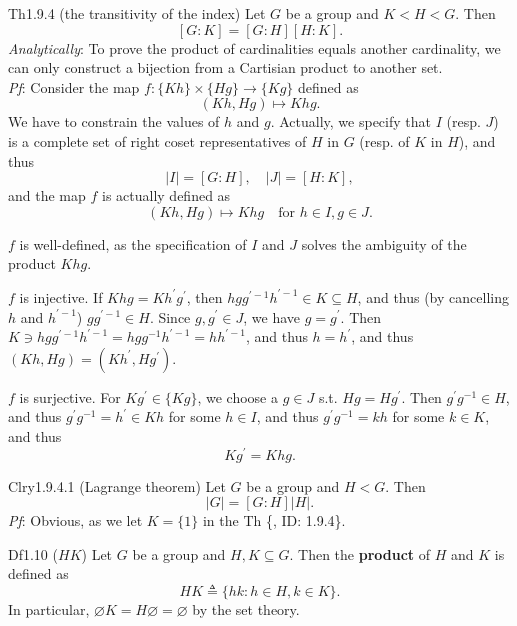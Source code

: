 \documentclass{article}
\begin{document}
\begin{Th}{Th1.9.4 (the transitivity of the index)}
    Let $G$ be a group and $K<H<G$. Then
    $$ [G:K] = [G:H][H:K]. $$
    \tcblower
    \textcolor{P}{\textit{Analytically}: To prove the product of cardinalities equals another cardinality, we can only construct a bijection from a Cartisian product to another set.} \\
    \textit{Pf}: Consider the map $f: \{Kh\}\times\{Hg\}\to \{Kg\}$ defined as
    $$ (Kh, Hg)\mapsto Khg. $$
    We have to constrain the values of $h$ and $g$. Actually, we specify that $I$ (resp. $J$) is a complete set of right coset representatives of $H$ in $G$ (resp. of $K$ in $H$), and thus
    $$ |I| = [G:H], \quad |J| = [H:K], $$
    and the map $f$ is actually defined as 
    $$ (Kh, Hg)\mapsto Khg \quad \text{for } h\in I, g\in J. $$
    \begin{compactenum}
        \item $f$ is well-defined, as the specification of $I$ and $J$ solves the ambiguity of the product $Khg$.
        \item $f$ is injective. If $Khg = Kh^\prime g^\prime$, then $hgg^{\prime-1}h^{\prime-1}\in K\subseteq H$, and thus (by cancelling $h$ and $h^{\prime-1}$) $gg^{\prime-1}\in H$. Since $g, g^\prime\in J$, we have $g = g^\prime$. Then $K\ni hgg^{\prime-1}h^{\prime-1} = hgg^{-1}h^{\prime-1} = hh^{\prime-1}$, and thus $h = h^\prime$, and thus $(Kh, Hg) = (Kh^\prime, Hg^\prime)$.
        \item $f$ is surjective. For $Kg^\prime\in\{Kg\}$, we choose a $g\in J$ s.t. $Hg = Hg^\prime$. Then $g^\prime g^{-1}\in H$, and thus $g^\prime g^{-1} = h^\prime \in Kh$ for some $h\in I$, and thus $g^\prime g^{-1} = kh$ for some $k\in K$, and thus
        $$ Kg^\prime = Khg. $$
    \end{compactenum}
\end{Th}

\begin{Th}{Clry1.9.4.1 (Lagrange theorem)}
    Let $G$ be a group and $H<G$. Then
    $$ |G| = [G:H]|H|. $$
    \tcblower
    \textit{Pf}: Obvious, as we let $K = \{1\}$ in the Th \{, ID: 1.9.4\}.
\end{Th}

\begin{Df}{Df1.10 ($HK$)}
    Let $G$ be a group and $H, K\subseteq G$. Then the \textbf{product} of $H$ and $K$ is defined as
    $$ HK \triangleq \{hk: h\in H, k\in K\}. $$
    \textcolor{Th}{In particular, $\varnothing K = H\varnothing = \varnothing$ by the set theory.}
\end{Df}
\end{document}
